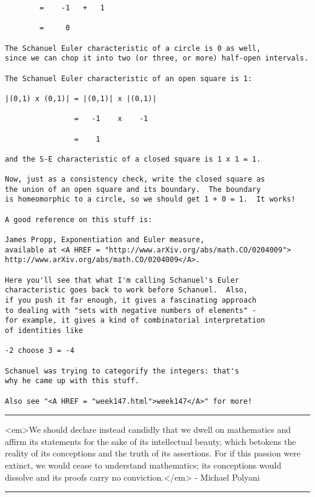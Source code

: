 \begin{verbatim}
        =    -1   +   1

        =     0
           
The Schanuel Euler characteristic of a circle is 0 as well,
since we can chop it into two (or three, or more) half-open intervals.

The Schanuel Euler characteristic of an open square is 1:

|(0,1) x (0,1)| = |(0,1)| x |(0,1)| 

                =   -1    x    -1

                =    1

and the S-E characteristic of a closed square is 1 x 1 = 1.

Now, just as a consistency check, write the closed square as 
the union of an open square and its boundary.  The boundary
is homeomorphic to a circle, so we should get 1 + 0 = 1.  It works!

A good reference on this stuff is:

James Propp, Exponentiation and Euler measure,
available at <A HREF = "http://www.arXiv.org/abs/math.CO/0204009">
http://www.arXiv.org/abs/math.CO/0204009</A>.

Here you'll see that what I'm calling Schanuel's Euler
characteristic goes back to work before Schanuel.  Also,
if you push it far enough, it gives a fascinating approach 
to dealing with "sets with negative numbers of elements" - 
for example, it gives a kind of combinatorial interpretation
of identities like

-2 choose 3 = -4

Schanuel was trying to categorify the integers: that's
why he came up with this stuff.

Also see "<A HREF = "week147.html">week147</A>" for more!
\end{verbatim}
    


\par\noindent\rule{\textwidth}{0.4pt}
<em>We should declare instead candidly that we dwell on mathematics and 
affirm its statements for the sake of its intellectual beauty, which 
betokens the reality of its conceptions and the truth of its assertions. 
For if this passion were extinct, we would cease to understand mathematics; 
its conceptions would dissolve and its proofs carry no conviction.</em> - 
Michael Polyani
\par\noindent\rule{\textwidth}{0.4pt}

